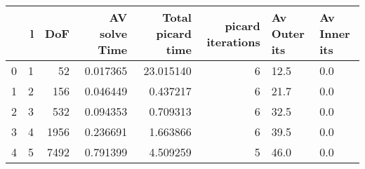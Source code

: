 \begin{tabular}{lrrrrrll}
\toprule
{} &  l &   DoF &  AV solve Time &  Total picard time &  picard iterations & Av Outer its & Av Inner its \\
\midrule
0 &  1 &    52 &       0.017365 &          23.015140 &                  6 &         12.5 &          0.0 \\
1 &  2 &   156 &       0.046449 &           0.437217 &                  6 &         21.7 &          0.0 \\
2 &  3 &   532 &       0.094353 &           0.709313 &                  6 &         32.5 &          0.0 \\
3 &  4 &  1956 &       0.236691 &           1.663866 &                  6 &         39.5 &          0.0 \\
4 &  5 &  7492 &       0.791399 &           4.509259 &                  5 &         46.0 &          0.0 \\
\bottomrule
\end{tabular}
